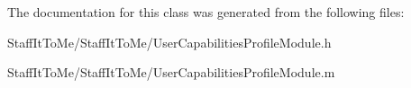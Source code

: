 \-The documentation for this class was generated from the following files\-:\begin{DoxyCompactItemize}
\item 
\-Staff\-It\-To\-Me/\-Staff\-It\-To\-Me/\-User\-Capabilities\-Profile\-Module.\-h\item 
\-Staff\-It\-To\-Me/\-Staff\-It\-To\-Me/\-User\-Capabilities\-Profile\-Module.\-m\end{DoxyCompactItemize}
